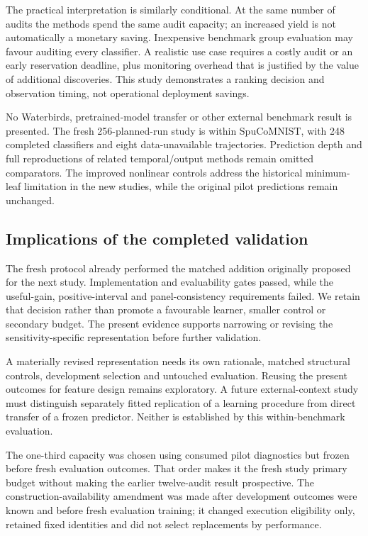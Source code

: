 The practical interpretation is similarly conditional. At the same number of audits the methods spend the same audit capacity; an increased yield is not automatically a monetary saving. Inexpensive benchmark group evaluation may favour auditing every classifier. A realistic use case requires a costly audit or an early reservation deadline, plus monitoring overhead that is justified by the value of additional discoveries. This study demonstrates a ranking decision and observation timing, not operational deployment savings.

No Waterbirds, pretrained-model transfer or other external benchmark result is presented. The fresh 256-planned-run study is within SpuCoMNIST, with 248 completed classifiers and eight data-unavailable trajectories. Prediction depth and full reproductions of related temporal/output methods remain omitted comparators. The improved nonlinear controls address the historical minimum-leaf limitation in the new studies, while the original pilot predictions remain unchanged.


\subsection{Implications of the completed validation}
The fresh protocol already performed the matched addition originally proposed for the next study. Implementation and evaluability gates passed, while the useful-gain, positive-interval and panel-consistency requirements failed. We retain that decision rather than promote a favourable learner, smaller control or secondary budget. The present evidence supports narrowing or revising the sensitivity-specific representation before further validation.

A materially revised representation needs its own rationale, matched structural controls, development selection and untouched evaluation. Reusing the present outcomes for feature design remains exploratory. A future external-context study must distinguish separately fitted replication of a learning procedure from direct transfer of a frozen predictor. Neither is established by this within-benchmark evaluation.

The one-third capacity was chosen using consumed pilot diagnostics but frozen before fresh evaluation outcomes. That order makes it the fresh study primary budget without making the earlier twelve-audit result prospective. The construction-availability amendment was made after development outcomes were known and before fresh evaluation training; it changed execution eligibility only, retained fixed identities and did not select replacements by performance.

